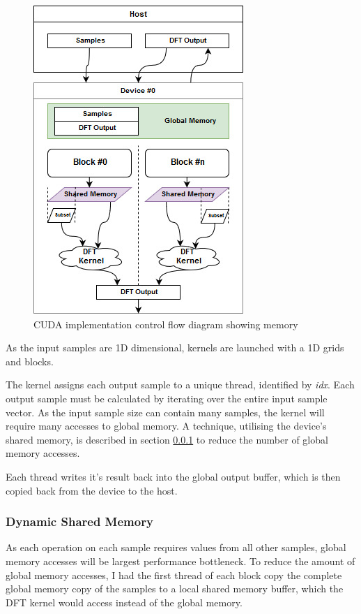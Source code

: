 \documentclass[11pt,a4paper]{article}
\begin{document}
\begin{figure}
\begin{center}
\includegraphics[scale=0.6]{cuda_impl1}
\end{center}
\caption{CUDA implementation control flow diagram showing memory }
\label{fig:cuda_impl1}
\end{figure}

As the input samples are 1D dimensional, kernels are launched with a 1D grids and blocks. 

The kernel assigns each output sample to a unique thread, identified by \textit{idx}. Each output sample must be calculated by iterating over the entire input sample vector. As the input sample size can contain many samples, the kernel will require many accesses to global memory. A technique, utilising the device's shared memory, is described in section \ref{sect:Dynamic Shared Memory} to reduce the number of global memory accesses.

Each thread writes it's result back into the global output buffer, which is then copied back from the device to the host.

\subsubsection{Dynamic Shared Memory} \label{sect:Dynamic Shared Memory}
As each operation on each sample requires values from all other samples, global memory accesses will be largest performance bottleneck. To reduce the amount of global memory accesses, I had the first thread of each block copy the complete global memory copy of the samples to a local shared memory buffer, which the DFT kernel would access instead of the global memory. 
\end{document}
